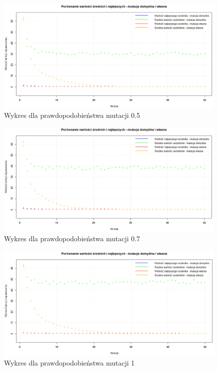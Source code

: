 \begin{figure}[H]
	\centering
	\hspace*{-0.8in}
	\includegraphics[scale = 0.5]{img/zad1/mut_0_5}
	\caption{Wykres dla prawdopodobieństwa mutacji 0.5}  
	\label{rys:mut_0.5} 
\end{figure}

\begin{figure}[H]
	\centering
	\hspace*{-0.8in}
	\includegraphics[scale = 0.5]{img/zad1/mut_0_7}
	\caption{Wykres dla prawdopodobieństwa mutacji 0.7}  
	\label{rys:mut_0.7} 
\end{figure}

\begin{figure}[H]
	\centering
	\hspace*{-0.8in}
	\includegraphics[scale = 0.5]{img/zad1/mut_1}
	\caption{Wykres dla prawdopodobieństwa mutacji 1}  
	\label{rys:mut_1} 
\end{figure}

